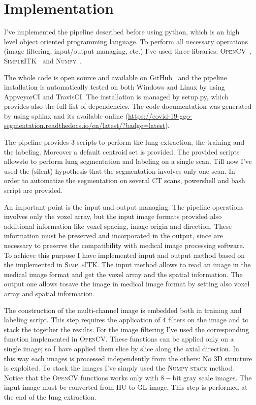 
	
	\section{Implementation}
	
	
	I've implemented the pipeline described before using python, which is an high level object oriented programming language. To perform all necessary operations (image filtering, input/output managing, etc.) I've used three libraries: \textsc{OpenCV}~\cite{OpenCV}, \textsc{SimpleITK}~\cite{SimpleITK} and \textsc{Numpy}~\cite{Numpy}.
	
	The whole code is open source and available on GitHub~\cite{REP:CTLungSeg} and the pipeline installation is automatically tested on both Windows and Linux by using AppveyorCI and TravisCI.  The installation is managed by setup.py, which provides also the full list of dependencies. The code documentation was generated by using sphinx and its available online (\url{https://covid-19-ggo-segmentation.readthedocs.io/en/latest/?badge=latest}). 
	
	The pipeline provides $3$ scripts to perform the lung extraction, the training and the labeling. Moreover a default centroid set is provided. The provided scripts allowsto to perform lung segmentation and labeling on a single scan.  
	Till now I've used the (silent) hypothesis that the segmentation involves only one scan. In order to automatize the segmentation on several CT scans, powershell and bash script are provided.
	
	An important point is the input and output managing. The pipeline operations involves only the voxel array, but the input image formats provided also additional information like voxel spacing, image origin and direction. These information must be preserved and incorporated in the output, since are necessary to preserve the compatibility with medical image processing software. 
	To achieve this purpose I have implemented input and output method based on the implemented in \textsc{SimpleITK}. The input method allows to read an image in the medical image format and get the voxel array and the spatial information. The output one allows tosave the image in medical image format by setting also voxel array and spatial information.

	
	The construction of the multi-channel image is embedded both in training and labeling script. This step requires the application of $4$ filters on the image and to stack the together the results. For the image filtering I've used the corresponding function implemented in \textsc{OpenCV}. These functions can be applied only on a single image; so I have applied them slice by slice along the axial direction. In this way each images is processed independently from the others: No 3D structure is exploited. To stack the images I've simply used the \textsc{Numpy} \textsc{stack} method.
	Notice that the \textsc{OpenCV} functions works only with $8-$bit gray scale images. The input image must be converted from HU to GL image. This step is performed at the end of the lung extraction.
	



	
	

 
